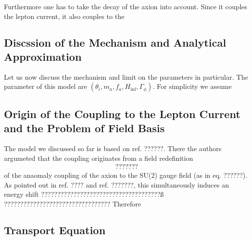 \documentclass[13pt,a4paper,twoside,titlepage]{article}
\begin{document}
Furthermore one has to take the decay of the axion into account.
Since it couples the lepton current, it also couples to the

\subsection{Discssion of the Mechanism and Analytical Approximation}
Let us now discuss the mechanism and limit on the parameters in particular.
The parameter of this model are $(\theta_i, m_a, f_a, H_\mathrm{inf}, \Gamma_\phi)$.
For simplicity we assume

\subsection{Origin of the Coupling to the Lepton Current and the Problem of Field Basis}
The model we discussed so far is based on ref. ??????.
There the authors argumeted that the coupling originates from a field redefinition
\begin{align}
    ???????
\end{align}
of the anaomaly coupling of the axion to the SU(2) gauge field (as in eq. ??????).
As pointed out in ref. ???? and ref. ???????, this simultaneously induces an energy shift
?????????????????????????????????????ß
?????????????????????????????????
Therefore


\subsection{Transport Equation}


\end{document}
